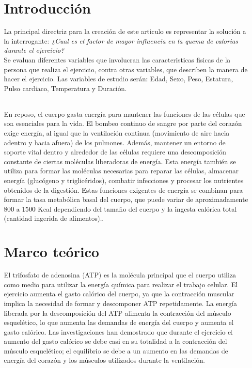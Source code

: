 \documentclass[5p,times,authoryear]{sciarticle}
\begin{document}
\begin{multicols}{2}   %



\section{Introducción}
La principal directriz para la creación de este articulo es representar la solución a la interrogante:
\emph {¿Cual es el factor de mayor influencia en la quema de calorias durante el ejercicio? }\\  


Se evaluan diferentes variables que involucran las caracteristicas fisicas de la persona que realiza el ejercicio, contra otras variables, que describen la manera de hacer el ejercicio.
Las variables de estudio serán: Edad, Sexo, Peso, Estatura, Pulso cardiaco, Temperatura y Duración.

\\

{En reposo, el cuerpo gasta energía para mantener las funciones de las células que son esenciales para la vida. El bombeo continuo de sangre por parte del corazón exige energía, al igual que la ventilación continua (movimiento de aire hacia adentro y hacia afuera) de los pulmones. Además, mantener un entorno de soporte vital dentro y alrededor de las células requiere una descomposición constante de ciertas moléculas liberadoras de energía. Esta energía también se utiliza para formar las moléculas necesarias para reparar las células, almacenar energía (glucógeno y triglicéridos), combatir infecciones y procesar los nutrientes obtenidos de la digestión. Estas funciones exigentes de energía se combinan para formar la tasa metabólica basal del cuerpo, que puede variar de aproximadamente 800 a 1500 Kcal dependiendo del tamaño del cuerpo y la ingesta calórica total (cantidad ingerida de alimentos).}.

\section{Marco teórico}

El trifosfato de adenosina (ATP) es la molécula principal que el cuerpo utiliza como medio para utilizar la energía química para realizar el trabajo celular. El ejercicio aumenta el gasto calórico del cuerpo, ya que la contracción muscular implica la necesidad de formar y descomponer ATP repetidamente. La energía liberada por la descomposición del ATP alimenta la contracción del músculo esquelético, lo que aumenta las demandas de energía del cuerpo y aumenta el gasto calórico. Las investigaciones han demostrado que durante el ejercicio el aumento del gasto calórico se debe casi en su totalidad a la contracción del músculo esquelético; el equilibrio se debe a un aumento en las demandas de energía del corazón y los músculos utilizados durante la ventilación.



\end{multicols}
\end{document}
